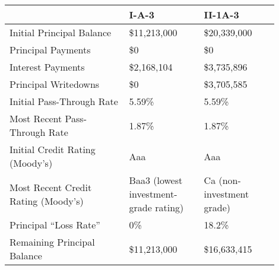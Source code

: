 \begin{tabular}{| p{0.4\linewidth} | p{0.25\linewidth} | p{0.25\linewidth} |}
\hline
 & \textbf{I-A-3} & \textbf{II-1A-3} \\
\hline
Initial Principal Balance & \$11,213,000 & \$20,339,000 \\
\hline
Principal Payments & \$0 & \$0 \\
\hline
Interest Payments & \$2,168,104 & \$3,735,896 \\
\hline
Principal Writedowns & \$0 & \$3,705,585 \\
\hline
Initial Pass-Through Rate & 5.59\% & 5.59\% \\
\hline
Most Recent Pass-Through Rate & 1.87\% & 1.87\% \\
\hline
Initial Credit Rating (Moody’s) & Aaa & Aaa \\
\hline
Most Recent Credit Rating (Moody’s) & Baa3 (lowest investment-grade rating) & Ca (non-investment grade) \\
\hline
Principal “Loss Rate” & 0\% & 18.2\% \\
\hline
Remaining Principal Balance & \$11,213,000 & \$16,633,415 \\
\hline
\end{tabular}
